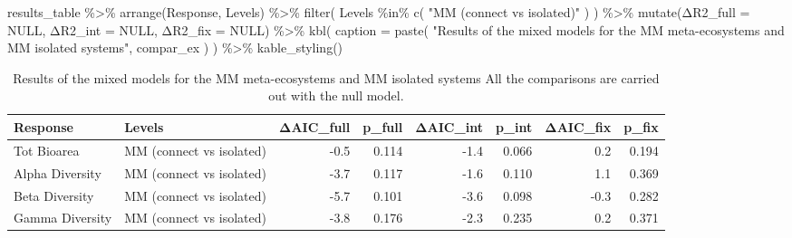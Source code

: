 \documentclass[
]{article}
\newenvironment{Shaded}{\begin{snugshade}}{\end{snugshade}}
\newcommand{\AttributeTok}[1]{\textcolor[rgb]{0.77,0.63,0.00}{#1}}
\newcommand{\ConstantTok}[1]{\textcolor[rgb]{0.00,0.00,0.00}{#1}}
\newcommand{\FunctionTok}[1]{\textcolor[rgb]{0.00,0.00,0.00}{#1}}
\newcommand{\NormalTok}[1]{#1}
\newcommand{\SpecialCharTok}[1]{\textcolor[rgb]{0.00,0.00,0.00}{#1}}
\newcommand{\StringTok}[1]{\textcolor[rgb]{0.31,0.60,0.02}{#1}}
\begin{document}
\begin{Shaded}
\begin{Highlighting}[]
\NormalTok{results\_table }\SpecialCharTok{\%\textgreater{}\%}
  \FunctionTok{arrange}\NormalTok{(Response, Levels) }\SpecialCharTok{\%\textgreater{}\%}
  \FunctionTok{filter}\NormalTok{(}
\NormalTok{    Levels }\SpecialCharTok{\%in\%} \FunctionTok{c}\NormalTok{(}
      \StringTok{"MM (connect vs isolated)"}
\NormalTok{    )}
\NormalTok{  ) }\SpecialCharTok{\%\textgreater{}\%}
  \FunctionTok{mutate}\NormalTok{(Δ}\AttributeTok{R2\_full =} \ConstantTok{NULL}\NormalTok{,}
\NormalTok{         Δ}\AttributeTok{R2\_int =} \ConstantTok{NULL}\NormalTok{,}
\NormalTok{         Δ}\AttributeTok{R2\_fix =} \ConstantTok{NULL}\NormalTok{) }\SpecialCharTok{\%\textgreater{}\%}
  \FunctionTok{kbl}\NormalTok{(}
    \AttributeTok{caption =} \FunctionTok{paste}\NormalTok{(}
      \StringTok{"Results of the mixed models for the MM meta{-}ecosystems and MM isolated systems"}\NormalTok{,}
\NormalTok{      compar\_ex}
\NormalTok{    )}
\NormalTok{  ) }\SpecialCharTok{\%\textgreater{}\%}
  \FunctionTok{kable\_styling}\NormalTok{()}
\end{Highlighting}
\end{Shaded}

\begin{table}

\caption{\label{tab:fig-connected-systems}Results of the mixed models for the MM meta-ecosystems and MM isolated systems All the comparisons are carried out with the null model.}
\centering
\begin{tabular}[t]{l|l|r|r|r|r|r|r}
\hline
Response & Levels & ΔAIC\_full & p\_full & ΔAIC\_int & p\_int & ΔAIC\_fix & p\_fix\\
\hline
Tot Bioarea & MM (connect vs isolated) & -0.5 & 0.114 & -1.4 & 0.066 & 0.2 & 0.194\\
\hline
Alpha Diversity & MM (connect vs isolated) & -3.7 & 0.117 & -1.6 & 0.110 & 1.1 & 0.369\\
\hline
Beta Diversity & MM (connect vs isolated) & -5.7 & 0.101 & -3.6 & 0.098 & -0.3 & 0.282\\
\hline
Gamma Diversity & MM (connect vs isolated) & -3.8 & 0.176 & -2.3 & 0.235 & 0.2 & 0.371\\
\hline
\end{tabular}
\end{table}
\end{document}
